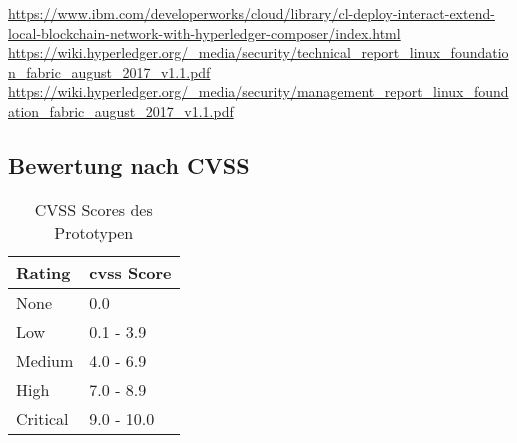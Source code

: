     \sloppy\url{https://www.ibm.com/developerworks/cloud/library/cl-deploy-interact-extend-local-blockchain-network-with-hyperledger-composer/index.html}\\
    \sloppy\url{https://wiki.hyperledger.org/_media/security/technical_report_linux_foundation_fabric_august_2017_v1.1.pdf}\\
    \sloppy\url{https://wiki.hyperledger.org/_media/security/management_report_linux_foundation_fabric_august_2017_v1.1.pdf}
    
    \subsection{Bewertung nach CVSS}
    	\begin{table}[H]
            \centering
            \begin{tabular}{|m{}|m{}|}
            \hline
            \textbf{Rating}   & \textbf{\gls{cvss} Score}   \\ \hline
            \rowcolor{light-gray}
            None              & 0.0                         \\ \hline
            Low               & 0.1 - 3.9                   \\ \hline
            \rowcolor{light-gray}
            Medium            & 4.0 - 6.9                   \\ \hline
            High              & 7.0 - 8.9                   \\ \hline
            \rowcolor{light-gray}
            Critical          & 9.0 - 10.0                  \\ \hline
            \end{tabular}
            \caption[CVSS Scores des Prototypen]{CVSS Scores des Prototypen}
            \label{tab:eval_cvss}
        \end{table}
